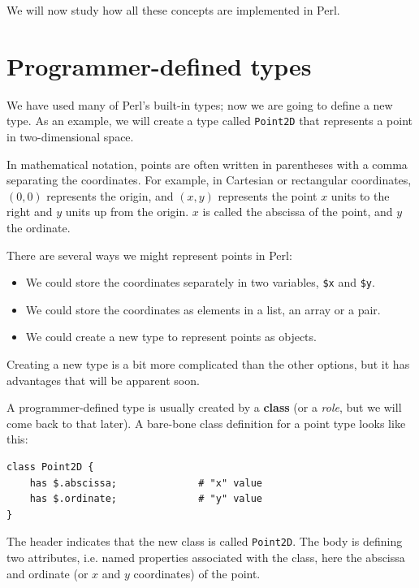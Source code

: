 We will now study how all these concepts are implemented in Perl.


\section{Programmer-defined types}
\label{point}

We have used many of Perl's built-in types; now we are going
to define a new type.  As an example, we will create a type
called {\tt Point2D} that represents a point in 
two-dimensional space.

In mathematical notation, points are often written in
parentheses with a comma separating the coordinates. For example,
in Cartesian or rectangular coordinates, $(0,0)$ represents 
the origin, and $(x,y)$ represents the point $x$ units to the 
right and $y$ units up from the origin. $x$ is called 
the abscissa of the point, and $y$ the ordinate.

There are several ways we might represent points in Perl:

\begin{itemize}

\item We could store the coordinates separately in two
variables, {\tt \$x} and {\tt \$y}.

\item We could store the coordinates as elements in a list, 
an array or a pair.

\item We could create a new type to represent points as
objects.

\end{itemize}

Creating a new type is a bit more complicated than the 
other options, but it has advantages that will be apparent soon.

A programmer-defined type is usually created by a {\bf class}
(or a \emph{role}, but we will come back to that later). 
A bare-bone class definition for a point type looks like this:

\begin{verbatim}
class Point2D {
    has $.abscissa;              # "x" value
    has $.ordinate;              # "y" value
}
\end{verbatim}
%
The header indicates that the new class is called {\tt Point2D}.
The body is defining two attributes, i.e. named properties 
associated with the class, here the abscissa and ordinate 
(or $x$ and $y$ coordinates) of the point.

